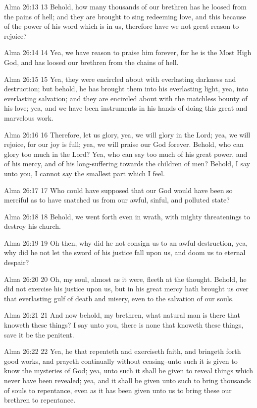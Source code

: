 Alma 26:13
 13 Behold, how many thousands of our brethren has he loosed from
the pains of hell; and they are brought to sing redeeming love,
and this because of the power of his word which is in us,
therefore have we not great reason to rejoice?

Alma 26:14
 14 Yea, we have reason to praise him forever, for he is the Most
High God, and has loosed our brethren from the chains of hell.

Alma 26:15
 15 Yea, they were encircled about with everlasting darkness and
destruction; but behold, he has brought them into his everlasting
light, yea, into everlasting salvation; and they are encircled
about with the matchless bounty of his love; yea, and we have
been instruments in his hands of doing this great and marvelous
work.

Alma 26:16
 16 Therefore, let us glory, yea, we will glory in the Lord; yea,
we will rejoice, for our joy is full; yea, we will praise our God
forever. Behold, who can glory too much in the Lord? Yea, who
can say too much of his great power, and of his mercy, and of his
long-suffering towards the children of men? Behold, I say unto
you, I cannot say the smallest part which I feel.

Alma 26:17
 17 Who could have supposed that our God would have been so
merciful as to have snatched us from our awful, sinful, and
polluted state?

Alma 26:18
 18 Behold, we went forth even in wrath, with mighty threatenings
to destroy his church.

Alma 26:19
 19 Oh then, why did he not consign us to an awful destruction,
yea, why did he not let the sword of his justice fall upon us,
and doom us to eternal despair?

Alma 26:20
 20 Oh, my soul, almost as it were, fleeth at the thought.
Behold, he did not exercise his justice upon us, but in his great
mercy hath brought us over that everlasting gulf of death and
misery, even to the salvation of our souls.

Alma 26:21
 21 And now behold, my brethren, what natural man is there that
knoweth these things? I say unto you, there is none that knoweth
these things, save it be the penitent.

Alma 26:22
 22 Yea, he that repenteth and exerciseth faith, and bringeth
forth good works, and prayeth continually without ceasing--unto
such it is given to know the mysteries of God; yea, unto such it
shall be given to reveal things which never have been revealed;
yea, and it shall be given unto such to bring thousands of souls
to repentance, even as it has been given unto us to bring these
our brethren to repentance.

